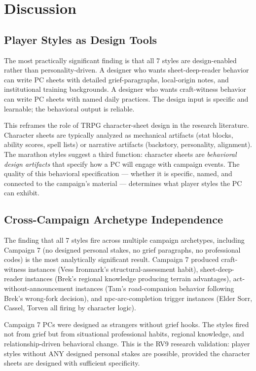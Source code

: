 
\section{Discussion}
\label{sec:discussion}

\subsection{Player Styles as Design Tools}

The most practically significant finding is that all 7 styles are design-enabled rather
than personality-driven. A designer who wants sheet-deep-reader behavior can write
PC sheets with detailed grief-paragraphs, local-origin notes, and institutional training
backgrounds. A designer who wants craft-witness behavior can write PC sheets with named
daily practices. The design input is specific and learnable; the behavioral output is
reliable.

This reframes the role of TRPG character-sheet design in the research literature.
Character sheets are typically analyzed as mechanical artifacts (stat blocks, ability
scores, spell lists) or narrative artifacts (backstory, personality, alignment). The
marathon styles suggest a third function: character sheets are \textit{behavioral design
artifacts} that specify how a PC will engage with campaign events. The quality of this
behavioral specification --- whether it is specific, named, and connected to the
campaign's material --- determines what player styles the PC can exhibit.

\subsection{Cross-Campaign Archetype Independence}

The finding that all 7 styles fire across multiple campaign archetypes, including
Campaign 7 (no designed personal stakes, no grief paragraphs, no professional codes)
is the most analytically significant result. Campaign 7 produced craft-witness instances
(Vess Ironmark's structural-assessment habit), sheet-deep-reader instances (Brek's
regional knowledge producing terrain advantages), act-without-announcement instances
(Tam's road-companion behavior following Brek's wrong-fork decision), and npc-arc-completion
trigger instances (Elder Sorr, Cassel, Torven all firing by character logic).

Campaign 7 PCs were designed as strangers without grief hooks. The styles fired not
from grief but from situational professional habits, regional knowledge, and
relationship-driven behavioral change. This is the RV9 research validation: player
styles without ANY designed personal stakes are possible, provided the character
sheets are designed with sufficient specificity.

